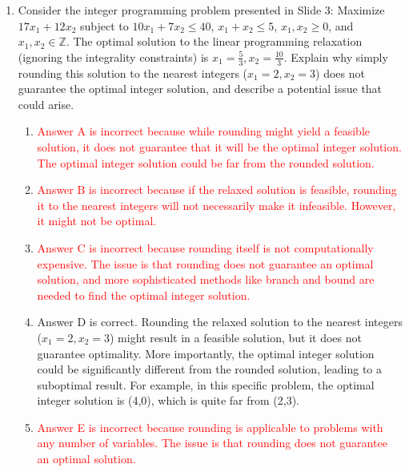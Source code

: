 \documentclass{article}%
\newcommand{\incorrect}[1]{\textcolor{red}{#1}}
\begin{document}
\begin{enumerate}
\begin{enumerate}
\item \incorrect{The alternative systems do not simplify the computational complexity of checking feasibility.  They provide a theoretical result that is useful in proving other theorems and understanding the duality between primal and dual problems.}%
\item \incorrect{The alternative systems are applicable to systems with both inequality and equality constraints, as different variants of Farkas' Lemma address these different cases.}%
\end{enumerate}%
\vspace{1em}%
\item Consider the integer programming problem presented in Slide 3: Maximize $17x_1 + 12x_2$ subject to $10x_1 + 7x_2 \le 40$, $x_1 + x_2 \le 5$, $x_1, x_2 \ge 0$, and $x_1, x_2 \in \mathbb{Z}$.  The optimal solution to the linear programming relaxation (ignoring the integrality constraints) is $x_1 = \frac{5}{3}, x_2 = \frac{10}{3}$.  Explain why simply rounding this solution to the nearest integers ($x_1 = 2, x_2 = 3$) does not guarantee the optimal integer solution, and describe a potential issue that could arise.%
\begin{enumerate}%
\item \incorrect{Answer A is incorrect because while rounding might yield a feasible solution, it does not guarantee that it will be the optimal integer solution. The optimal integer solution could be far from the rounded solution.}%
\item \incorrect{Answer B is incorrect because if the relaxed solution is feasible, rounding it to the nearest integers will not necessarily make it infeasible. However, it might not be optimal.}%
\item \incorrect{Answer C is incorrect because rounding itself is not computationally expensive. The issue is that rounding does not guarantee an optimal solution, and more sophisticated methods like branch and bound are needed to find the optimal integer solution.}%
\item Answer D is correct. Rounding the relaxed solution to the nearest integers ($x_1 = 2, x_2 = 3$) might result in a feasible solution, but it does not guarantee optimality.  More importantly, the optimal integer solution could be significantly different from the rounded solution, leading to a suboptimal result. For example, in this specific problem, the optimal integer solution is (4,0), which is quite far from (2,3).%
\item \incorrect{Answer E is incorrect because rounding is applicable to problems with any number of variables. The issue is that rounding does not guarantee an optimal solution.}%

\end{enumerate}
\end{enumerate}
\end{document}
